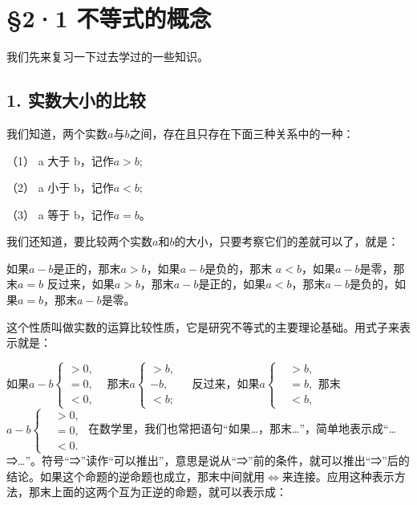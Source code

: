 \section{§2·1 不等式的概念}

我们先来复习一下过去学过的一些知识。

\subsection{1. 实数大小的比较}

我们知道，两个实数\(a\)与\(b\)之间，存在且只存在下面三种关系中的一种：

（1） a 大于 b，记作\(a > b;\)

（2） a 小于 b，记作\(a < b;\)

（3） a 等于 b，记作\(a = b\)。

我们还知道，要比较两个实数\(a\)和\(b\)的大小，只要考察它们的差就可以了，就是：

如果\(a - b\)是正的，那末\(a > b\)，如果\(a - b\)是负的，那末
\(a < b\)，如果\(a - b\)是零，那末\(a = b\)
反过来，如果\(a > b\)，那末\(a - b\)是正的，如果\(a < b\)，那末\(a - b\)是负的，如果\(a = b\)，那末\(a - b\)是零。

这个性质叫做实数的运算比较性质，它是研究不等式的主要理论基础。用式子来表示就是：

如果\(a - b\left\{ \begin{array}{ll} > 0, & \\ = 0, & \\ < 0, & \end{array} \right.\)那末\(a\left\{ \begin{array}{ll} > b, & \\ - b, & \\ < b; & \end{array} \right.\)
反过来，如果\(a\left\{\begin{aligned}&>b,\\&=b,\\&<b,\end{aligned}\right.\)那末\(a-b\left\{\begin{aligned}&>0,\\&=0,\\&<0.\end{aligned}\right.\)
在数学里，我们也常把语句``如果\ldots，那末\ldots''，简单地表示成``\ldots⇒\ldots''。符号``⇒''读作``可以推出''，意思是说从``⇒''前的条件，就可以推出``⇒''后的结论。如果这个命题的逆命题也成立，那末中间就用\(\Leftrightarrow\)来连接。应用这种表示方法，那末上面的这两个互为正逆的命题，就可以表示成：

